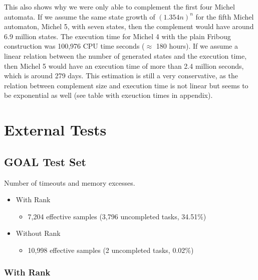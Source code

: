 This also shows why we were only able to complement the first four Michel automata. If we assume the same state growth of $(1.354n)^n$ for the fifth Michel automaton, Michel 5, with seven states, then the complement would have around 6.9 million states. The execution time for Michel 4 with the plain Friboug construction was 100,976 CPU time seconds ($\approx$ 180 hours). If we assume a linear relation between the number of generated states and the execution time, then Michel 5 would have an execution time of more than 2.4 million seconds, which is around 279 days. This estimation is still a very conservative, as the relation between complement size and execution time is not linear but seems to be exponential as well (see table with exeuction times in appendix). 




\section{External Tests}
\label{ext}

\subsection{GOAL Test Set}

\begin{table}[ht]
\centering

\caption{Number of timeouts and memory excesses.}
\end{table}

\begin{itemize}
\item With Rank
  \begin{itemize}
  \item 7,204 effective samples (3,796 uncompleted tasks, 34.51\%)
  \end{itemize}
\item Without Rank
  \begin{itemize}
  \item 10,998 effective samples (2 uncompleted tasks, 0.02\%)
  \end{itemize}
\end{itemize}


\subsubsection{With Rank}


